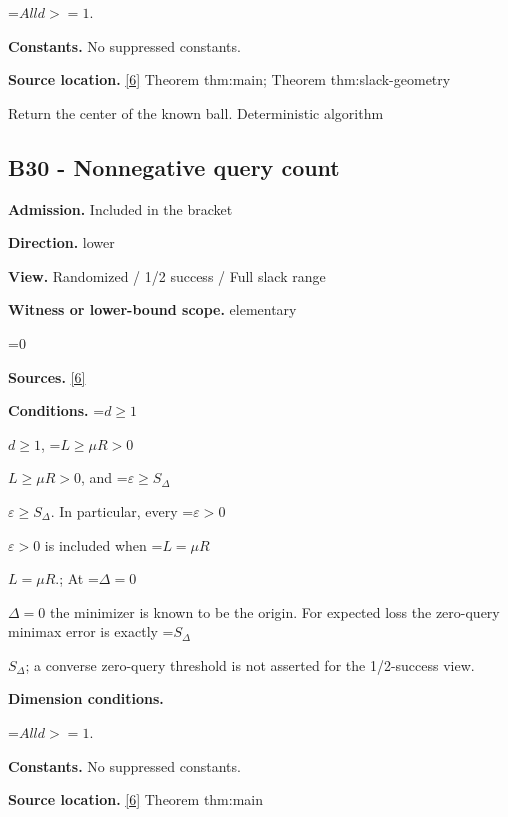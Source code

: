 \documentclass[10pt,a4paper]{article}
\newcommand{\AtlasMath}[1]{\par\begingroup\centering\setbox0=\hbox{$\displaystyle #1$}\ifdim\wd0>1.4\linewidth\typeout{ATLAS WIDE FORMULA: \the\wd0}\fi\ifdim\wd0>\linewidth\resizebox{\linewidth}{!}{\box0}\else\box0\fi\par\endgroup}
\newcommand{\AtlasInlineMath}[1]{\begingroup\setbox0=\hbox{$#1$}\ifdim\wd0>.4\linewidth\endgroup\AtlasMath{#1}\else\endgroup$#1$\fi}
\begin{document}
\AtlasMath{All d>=1.}


\textbf{Constants.} No suppressed constants.



\textbf{Source location.} \href{https://github.com/WU-Wendao/Colombo/blob/main/colombo_sensorium/Complexity_altas/data/sources/colombo/U10/manuscript.pdf}{[6]} Theorem thm:main; Theorem thm:slack-geometry



Return the center of the known ball. Deterministic algorithm



\subsection{B30 - Nonnegative query count}


\textbf{Admission.} Included in the bracket



\textbf{Direction.} lower



\textbf{View.} Randomized / 1/2 success / Full slack range



\textbf{Witness or lower-bound scope.} elementary



\AtlasMath{0}


\textbf{Sources.} \href{https://github.com/WU-Wendao/Colombo/blob/main/colombo_sensorium/Complexity_altas/data/sources/colombo/U10/manuscript.pdf}{[6]}



\textbf{Conditions.} \AtlasInlineMath{d\ge1}, \AtlasInlineMath{L\ge\mu R>0}, and \AtlasInlineMath{\varepsilon\ge S_\Delta}. In particular, every \AtlasInlineMath{\varepsilon>0} is included when \AtlasInlineMath{L=\mu R}.; At \AtlasInlineMath{\Delta=0} the minimizer is known to be the origin. For expected loss the zero-query minimax error is exactly \AtlasInlineMath{S_\Delta}; a converse zero-query threshold is not asserted for the 1/2-success view.



\textbf{Dimension conditions.}



\AtlasMath{All d>=1.}


\textbf{Constants.} No suppressed constants.



\textbf{Source location.} \href{https://github.com/WU-Wendao/Colombo/blob/main/colombo_sensorium/Complexity_altas/data/sources/colombo/U10/manuscript.pdf}{[6]} Theorem thm:main
\end{document}
